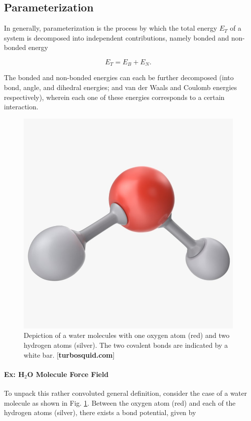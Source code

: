     \subsection{Parameterization}
    
    In generally, parameterization is the process by which the total energy $E_T$ of a system is decomposed into independent contributions, namely bonded and non-bonded energy
    
    \begin{equation}
        E_T = E_B + E_N.
    \end{equation}
    
    \noindent The bonded and non-bonded energies can each be further decomposed (into bond, angle, and dihedral energies; and van der Waals and Coulomb energies respectively), wherein each one of these energies corresponds to a certain interaction.
    
    \begin{figure}
        \centering
        \includegraphics[width=0.7\linewidth]{Figures/System/water-molecule.jpg}
        \caption{Depiction of a water molecules with one oxygen atom (red) and two hydrogen atoms (silver). The two covalent bonds are indicated by a white bar. [\textbf{turbosquid.com}]}
        \label{fig:water_molecule}
    \end{figure}
    

        \paragraph{Ex: H$_2$O Molecule Force Field}

        To unpack this rather convoluted general definition, consider the case of a water molecule as shown in Fig. \ref{fig:water_molecule}. Between the oxygen atom (red) and each of the hydrogen atoms (silver), there exists a bond potential, given by
        
